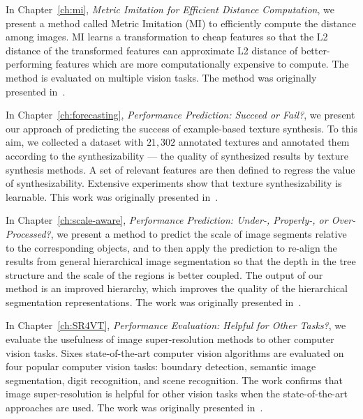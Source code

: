 In Chapter~\ref{ch:mi}, \emph{Metric Imitation for Efficient Distance Computation}, we present a method called Metric Imitation (MI) to efficiently compute the distance among images.  MI learns a transformation to cheap features so that the L2 distance of the transformed features can approximate L2 distance of  better-performing features which are more computationally expensive to compute.  The method is evaluated on multiple vision tasks. The method was originally presented in~\citep{metric:imitation}. 

In Chapter~\ref{ch:forecasting}, \emph{Performance Prediction: Succeed or Fail?}, we present our approach of predicting the success of example-based texture synthesis.  To this aim, we collected a dataset with  $21,302$ annotated textures and annotated them  according to the synthesizability --- the quality of synthesized results by texture synthesis methods. A set of relevant features are then defined to regress the value of synthesizability. Extensive experiments show that texture synthesizability is learnable. This work was originally presented in~\citep{dai:synthesizability}. 

In Chapter~\ref{ch:scale-aware}, \emph{Performance Prediction: Under-, Properly-, or Over-Processed?}, 
we present a method to predict the  scale of image segments relative to the corresponding objects, and to then apply the prediction to re-align the results from general hierarchical image segmentation so that the depth in the tree structure and the scale of the regions is better coupled. The output of our method is an improved hierarchy, which improves the quality of the hierarchical segmentation representations. The work was originally presented in~\citep{Chen2016}. 
  

In Chapter~\ref{ch:SR4VT}, \emph{Performance Evaluation: Helpful for Other Tasks?}, we evaluate the usefulness of image super-resolution methods to other computer vision tasks. Sixes state-of-the-art computer vision algorithms are evaluated on four popular computer vision tasks: boundary detection, semantic image segmentation, digit recognition, and scene recognition.  The work confirms that image super-resolution is helpful for other vision tasks when the state-of-the-art approaches are used. 
The work was originally presented in~\citep{SR4VTs:wacv16}. 


 